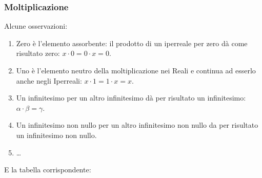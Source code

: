 \subsubsection{Moltiplicazione}
\label{subsec:insnum_moltiplicazione}

\noindent \begin{minipage}{.5\textwidth}
Alcune osservazioni:
\begin{enumerate} [noitemsep]
 \item Zero è l'elemento assorbente: il prodotto di un iperreale per zero
dà come risultato zero: $x \cdot 0=0 \cdot x=0$.
 \item Uno è l'elemento neutro della moltiplicazione nei Reali e continua ad 
esserlo anche negli Iperreali: $x \cdot 1=1 \cdot x=x$.
 \item Un infinitesimo per un altro infinitesimo dà per risultato un 
infinitesimo: $\alpha \cdot \beta=\gamma$.
 \item Un infinitesimo non nullo per un altro infinitesimo non nullo da 
per risultato un infinitesimo non nullo.
 \item \dots
\end{enumerate}
\end{minipage}
\hfill
\begin{minipage}{.45\textwidth}
E la tabella corrispondente:
\begin{center}
\renewcommand{\arraystretch}{.0}
\end{center}
\vspace{2mm}
\end{minipage}


